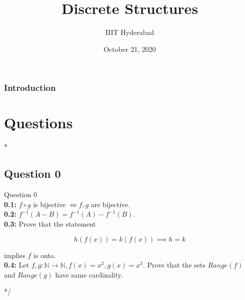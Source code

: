 \documentclass[xcolor=svgnames]{beamer}
\title[Discrete Structures]{Discrete Structures} %
\author{IIIT Hyderabad} %
\institute[] %
{
Monsoon 2020 \\ %
\medskip
\textit{Tutorial 11} %
}
\date{October 21, 2020} %
\begin{document}
\begin{frame}
\titlepage %
\end{frame}

\begin{frame}
\frametitle{Introduction} %
\tableofcontents %
\end{frame}


\section{Questions}
\/*
\subsection{Question 0}
\begin{frame}{Question 0}
    \\ \textbf{0.1:} $f \circ g$ is bijective $\iff f,g$ are bijective.
    \\ \textbf{0.2:}  $f^{-1}(A - B) = f^{-1}(A) - f^{-1}(B)$.
    \\ \textbf{0.3:} Prove that  the statement 
    
    $$h(f(x)) = k(f(x)) \implies h = k$$
    
    implies $f$ is onto.
    \\ \textbf{0.4:} Let $f,g:\mathbb{N} \rightarrow \mathbb{N},f(x)=x^2,g(x)=x^3$.  Prove that the sets $Range(f)$ and $Range(g)$ have same cardinality.
\end{frame}
*/
\end{document}
